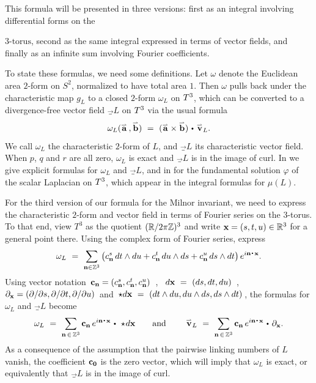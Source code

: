 This formula will be presented in three versions: first as an integral involving differential forms on the {$3\text{-torus}$, second as the same integral expressed in terms of vector fields, and finally as an infinite sum involving Fourier coefficients. 

To state these formulas, we need some definitions.   Let $\omega$ denote the Euclidean area $2$-form on $S^2$, normalized to have total area $1$.  Then $\omega$ pulls back under the characteristic map $g_L$ to a closed $2$-form $\omega_L$ on $T^3$, which can be converted to a divergence-free vector field $\vec_L$ on $T^3$ via the usual formula 
$$
\omega_L(\vc{\textup{\bf a}}\, ,\vc{\textup{\bf b}}) \ = \ (\vc{\textup{\bf a}}\times\vc{\textup{\bf b}})\dtw\vec_L.
$$  
We call  $\omega_L$  the {\itb characteristic $2$-form} of  $L$,  and  $\vec_L$  its {\itb characteristic vector field}.  When $p$, $q$ and $r$ are all zero, $\omega_L$ is exact and $\vec_L$ is in the image of curl.  In  we give explicit formulas for  $\omega_L$  and  $\vec_L$,  and in   for the fundamental solution $\varphi$ of the scalar Laplacian on $T^3$, which appear in the integral formulas for $\mu(L)$. 



For the third version of our formula for the Milnor invariant, we need to express the characteristic $2$-form and vector field in terms of Fourier series on the $3$-torus.  To that end, view $T^3$ as the quotient $(\mathbb R/2\pi\mathbb Z)^3$ and write $\textup{\bf x}=(s,t,u)\in\mathbb R^3$ for a general point there.  Using the complex form of Fourier series, express
$$
\omega_L \ = \ \sum_{\n\in\bz^3}\left(c^s_{\n} \, dt\wedge du+c^t_{\n} \, du\wedge ds+c^u_{\n} \, ds\wedge dt\right)e^{i\n\dte\x}.
$$
Using vector notation \,$\textup{\bf c}_{\textup{\bf n}} = (c^s_{\textup{\bf n}},c^t_{\textup{\bf n}},c^u_{\textup{\bf n}})$\ , \ $d\x \ = \ (ds, dt, du)$\ , \ $\partial_{\textup{\bf x}} = (\partial/\partial s,\partial/\partial t, \partial/\partial u)$ \,and\, $\star d\textup{\bf x} \ = \ (dt\wedge du, du\wedge ds, ds\wedge dt)$\,, the formulas for $\omega_L$ and $\vec_L$ become
$$
\omega_L\ =\ \sum_{\n\,\in\,\bz^3}\c_{\n}\, e^{i\n\dte\x}\dtw\star\!d\x \qquad\text{and }\qquad \vec_L \ = \ \sum_{\n\,\in\,\bz^3}\c_{\n}\, e^{i\n\dte\x}\dtw \partial_\x.
$$
As a consequence of the assumption that the pairwise linking numbers of $L$ vanish, the coefficient $\textup{\bf c}_{{\bf0}}$ is the zero vector, which will imply that $\omega_L$ is exact, or equivalently that $\vec_L$ is in the image of curl.

}

